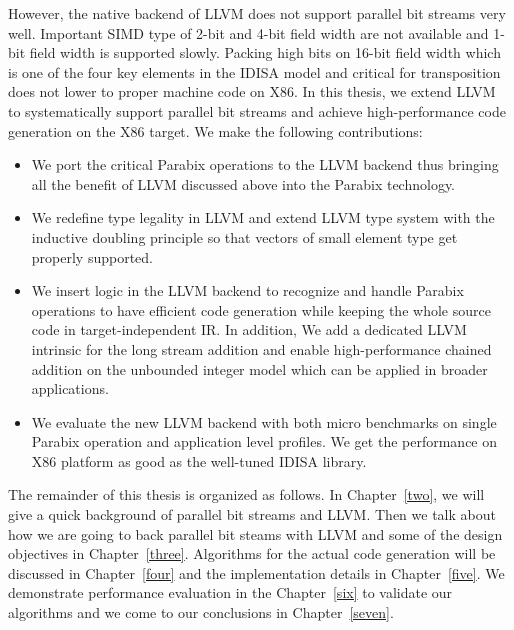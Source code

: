 However, the native backend of LLVM does not support parallel bit streams very well. Important SIMD type of 2-bit and 4-bit field width are not available and 1-bit field width is supported slowly. Packing high bits on 16-bit field width which is one of the four key elements in the IDISA model and critical for transposition does not lower to proper machine code on X86. In this thesis, we extend LLVM to systematically support parallel bit streams and achieve high-performance code generation on the X86 target. We make the following contributions:

\begin{itemize}
  \item We port the critical Parabix operations to the LLVM backend thus bringing all the benefit of LLVM discussed above into the Parabix technology.
  \item We redefine type legality in LLVM and extend LLVM type system with the inductive doubling principle so that vectors of small element type get properly supported.
  \item We insert logic in the LLVM backend to recognize and handle Parabix operations to have efficient code generation while keeping the whole source code in target-independent IR\@. In addition, We add a dedicated LLVM intrinsic for the long stream addition and enable high-performance chained addition on the unbounded integer model which can be applied in broader applications.
  \item We evaluate the new LLVM backend with both micro benchmarks on single Parabix operation and application level profiles. We get the performance on X86 platform as good as the well-tuned IDISA library.
\end{itemize}

The remainder of this thesis is organized as follows. In Chapter~\ref{two}, we will give a quick background of parallel bit streams and LLVM\@. Then we talk about how we are going to back parallel bit steams with LLVM and some of the design objectives in Chapter~\ref{three}. Algorithms for the actual code generation will be discussed in Chapter~\ref{four} and the implementation details in Chapter~\ref{five}. We demonstrate performance evaluation in the Chapter~\ref{six} to validate our algorithms and we come to our conclusions in Chapter~\ref{seven}.


